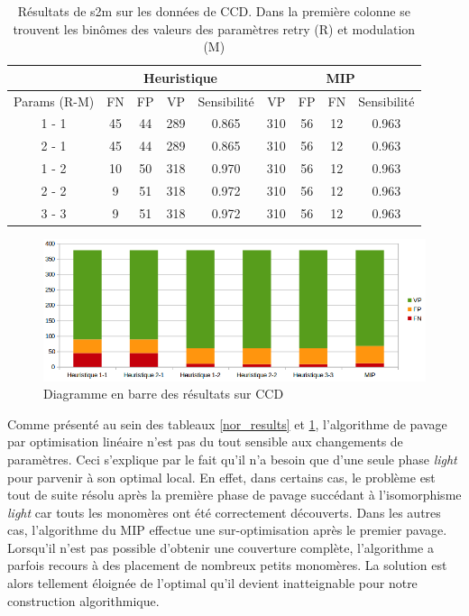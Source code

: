 \begin{table}[!ht]
  \centering
  \begin{tabular}{|c|c|c|c|c|c|c|c|c|}
    \hline
    & \multicolumn{4}{c|}{Heuristique} & \multicolumn{4}{c|}{MIP} \\
    \hline
    Params (R-M) & FN & FP & VP & Sensibilité & VP & FP & FN & Sensibilité \\
    \hline
    1 - 1 & 45 & 44 & 289 & 0.865 & 310 & 56 & 12 & 0.963 \\
    \hline
    2 - 1 & 45 & 44 & 289 & 0.865 & 310 & 56 & 12 & 0.963 \\
    \hline
    1 - 2 & 10 & 50 & 318 & 0.970 & 310 & 56 & 12 & 0.963 \\
    \hline
    2 - 2 & 9 & 51 & 318 & 0.972 & 310 & 56 & 12 & 0.963 \\
    \hline
    3 - 3 & 9 & 51 & 318 & 0.972 & 310 & 56 & 12 & 0.963 \\
    \hline
  \end{tabular}
  \caption{\label{ccd_results}Résultats de s2m sur les données de CCD.
  Dans la première colonne se trouvent les binômes des valeurs des paramètres retry (R) et modulation (M)}
\end{table}

\begin{figure}[!ht]
  \begin{center}
    \includegraphics[width=450px]{Figures/s2m/results/CCD.png}
    \caption{\label{ccd_graph}Diagramme en barre des résultats sur CCD}
  \end{center}
\end{figure}


Comme présenté au sein des tableaux \ref{nor_results} et \ref{ccd_results}, l'algorithme de pavage par optimisation linéaire n'est pas du tout sensible aux changements de paramètres.
Ceci s'explique par le fait qu'il n'a besoin que d'une seule phase \textit{light} pour parvenir à son optimal local.
En effet, dans certains cas, le problème est tout de suite résolu après la première phase de pavage succédant à l'isomorphisme \textit{light} car touts les monomères ont été correctement découverts.
Dans les autres cas, l'algorithme du MIP effectue une sur-optimisation après le premier pavage.
Lorsqu'il n'est pas possible d'obtenir une couverture complète, l'algorithme a parfois recours à des placement de nombreux petits monomères.
La solution est alors tellement éloignée de l'optimal qu'il devient inatteignable pour notre construction algorithmique.

